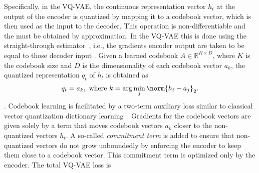 Specifically, in the VQ-VAE, the continuous representation vector $h_t$ at the output of the encoder is quantized by mapping it to a codebook vector, which is then used as the input to the decoder. This operation is non-differentiable and the  must be obtained by approximation. In the VQ-VAE this is done using the straight-through estimator~\cite{bengio2013estimating}, i.e., the gradients  encoder output are taken to be equal to those  decoder input . Given a learned codebook $A\in\mathbb{R}^{K \times D}$, where $K$ is the codebook size and $D$ is the dimensionality of each codebook vector $a_k$, the quantized representation $q_t$ of $h_t$ is obtained as
\begin{align}
    q_t = a_k, \text{ where } k=\arg\min_j \norm{h_t - a_j}_2 .
\end{align}
. 
Codebook learning is facilitated by a two-term auxiliary loss similar to
classical vector quantization dictionary 
learning~\cite{burton_generalization_1983, soong_vector_1985}. 
Gradients for the codebook vectors are given solely by a term that moves
codebook vectors $a_k$ closer to the non-quantized vectors $h_t$. A so-called
\emph{commitment term} is added to ensure that non-quantized vectors do not grow
unboundedly by enforcing the encoder to keep them close to a codebook vector.
This commitment term is optimized only by the encoder. The
total VQ-VAE loss  is
